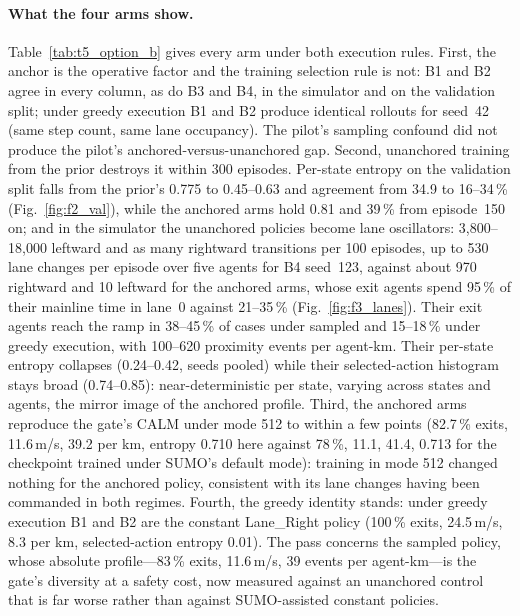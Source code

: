 \paragraph{What the four arms show.}
Table~\ref{tab:t5_option_b} gives every arm under both execution rules. First, the anchor is the operative factor and the training selection rule is not: B1 and B2 agree in every column, as do B3 and B4, in the simulator and on the validation split; under greedy execution B1 and B2 produce identical rollouts for seed~42 (same step count, same lane occupancy). The pilot's sampling confound did not produce the pilot's anchored-versus-unanchored gap. Second, unanchored training from the prior destroys it within 300 episodes. Per-state entropy on the validation split falls from the prior's 0.775 to 0.45--0.63 and agreement from 34.9 to 16--34\,\% (Fig.~\ref{fig:f2_val}), while the anchored arms hold 0.81 and 39\,\% from episode~150 on; and in the simulator the unanchored policies become lane oscillators: 3{,}800--18{,}000 leftward and as many rightward transitions per 100 episodes, up to 530 lane changes per episode over five agents for B4 seed~123, against about 970 rightward and 10 leftward for the anchored arms, whose exit agents spend 95\,\% of their mainline time in lane~0 against 21--35\,\% (Fig.~\ref{fig:f3_lanes}). Their exit agents reach the ramp in 38--45\,\% of cases under sampled and 15--18\,\% under greedy execution, with 100--620 proximity events per agent-km. Their per-state entropy collapses (0.24--0.42, seeds pooled) while their selected-action histogram stays broad (0.74--0.85): near-deterministic per state, varying across states and agents, the mirror image of the anchored profile. Third, the anchored arms reproduce the gate's CALM under mode 512 to within a few points (82.7\,\% exits, 11.6\,m/s, 39.2 per km, entropy 0.710 here against 78\,\%, 11.1, 41.4, 0.713 for the checkpoint trained under SUMO's default mode): training in mode 512 changed nothing for the anchored policy, consistent with its lane changes having been commanded in both regimes. Fourth, the greedy identity stands: under greedy execution B1 and B2 are the constant Lane\_Right policy (100\,\% exits, 24.5\,m/s, 8.3 per km, selected-action entropy 0.01). The pass concerns the sampled policy, whose absolute profile---83\,\% exits, 11.6\,m/s, 39 events per agent-km---is the gate's diversity at a safety cost, now measured against an unanchored control that is far worse rather than against SUMO-assisted constant policies.

